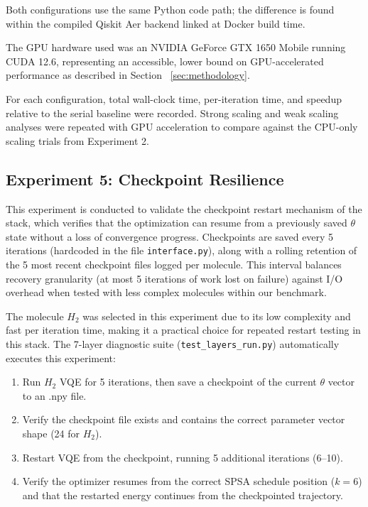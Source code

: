 Both configurations use the same Python code path; the difference is found within the compiled Qiskit Aer backend linked at Docker build time.

The GPU hardware used was an NVIDIA GeForce GTX 1650 Mobile running CUDA 12.6, representing an accessible, lower bound on GPU-accelerated performance as described in Section ~\ref{sec:methodology}.   

For each configuration, total wall-clock time, per-iteration time, and speedup relative to the serial baseline 
were recorded. Strong scaling and weak scaling analyses were repeated with GPU acceleration to compare against 
the CPU-only scaling trials from Experiment 2.

\subsection{Experiment 5: Checkpoint Resilience}
This experiment is conducted to validate the checkpoint restart mechanism of the stack, which verifies that 
the optimization can resume from a previously saved $\theta$ state without a loss of convergence progress. Checkpoints 
are saved every 5 iterations (hardcoded in the file \texttt{interface.py}), along with a rolling retention of the 5 most recent 
checkpoint files logged per molecule. This interval balances recovery granularity (at most 5 iterations 
of work lost on failure) against I/O overhead when tested with less complex molecules within our benchmark. 

The molecule $H_{2}$ was selected in this experiment due to its low complexity and fast per iteration time, making it a 
practical choice for repeated restart testing in this stack. The 7-layer diagnostic suite (\texttt{test\_layers\_run.py}) automatically executes this experiment:

\begin{enumerate}
    \item Run $H_{2}$ VQE for 5 iterations, then save a checkpoint of the current $\theta$ vector to an .npy file.
    \item Verify the checkpoint file exists and contains the correct parameter vector shape (24 for $H_{2}$).
    \item Restart VQE from the checkpoint, running 5 additional iterations (6--10).
    \item Verify the optimizer resumes from the correct SPSA schedule position ($k=6$) and that the restarted energy continues from the checkpointed trajectory.
\end{enumerate}

